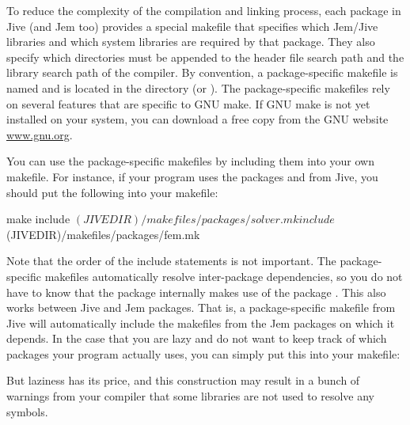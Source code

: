 To reduce the complexity of the compilation and linking process, each
package in Jive (and Jem too) provides a special makefile that specifies
which Jem/Jive libraries and which system libraries are required by that
package. They also specify which directories must be appended to the
header file search path and the library search path of the compiler. By
convention, a package-specific makefile is named
 and is located in the directory
 (or
). The package-specific makefiles
rely on several features that are specific to GNU make. If GNU make
is not yet installed on your system, you can download a free copy from
the GNU website \url{www.gnu.org}.

You can use the package-specific makefiles by including them into your
own makefile. For instance, if your program uses the packages
 and  from Jive, you should put the following into
your makefile:
\begin{Source}{make}
  include $(JIVEDIR)/makefiles/packages/solver.mk
  include $(JIVEDIR)/makefiles/packages/fem.mk
\end{Source}

Note that the order of the include statements is not important. The
package-specific makefiles automatically resolve inter-package
dependencies, so you do not have to know that the package 
internally makes use of the package . This also works
between Jive and Jem packages. That is, a package-specific makefile from
Jive will automatically include the makefiles from the Jem packages on
which it depends. In the case that you are lazy and do not want to keep
track of which packages your program actually uses, you can simply put
this into your makefile:
But laziness has its price, and this construction may result in a
bunch of warnings from your compiler that some libraries are not used
to resolve any symbols.

